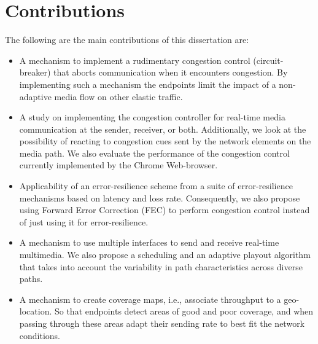
\section{Contributions}

The following are the main contributions of this dissertation are:

\begin{itemize}
\setlength{\itemsep}{0pt}


\item A mechanism to implement a rudimentary congestion control (circuit-breaker) 
that aborts communication when it encounters congestion. By
implementing such a mechanism the endpoints limit the impact of a non-adaptive
media flow on other elastic traffic.

\item A study on implementing the congestion controller for real-time media
communication at the sender, receiver, or both. Additionally, we look at the
possibility of reacting to congestion cues sent by the network elements on the
media path. We also evaluate the performance of the congestion control
currently implemented by the Chrome Web-browser.

\item Applicability of an error-resilience scheme from a suite of
error-resilience mechanisms based on latency and loss rate. Consequently, we
also propose using Forward Error Correction (FEC) to perform congestion
control instead of just using it for error-resilience.

\item A mechanism to use multiple interfaces to send and receive real-time
multimedia. We also propose a scheduling and an adaptive playout algorithm
that takes into account the variability in path characteristics across diverse
paths.

\item A mechanism to create coverage maps, i.e., associate throughput to a
geo-location. So that endpoints detect areas of good and poor coverage, and
when passing through these areas adapt their sending rate to best fit the
network conditions.

\end{itemize}

